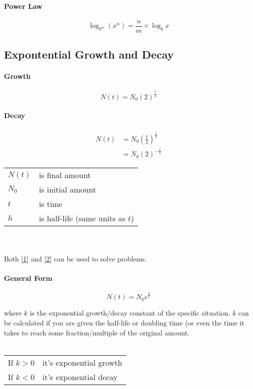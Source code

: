 \documentclass{article}
\numberwithin{equation}{section}
\begin{document}
\paragraph{Power Law}
\begin{equation}
	\log_{b^m}(x^n) = \frac{n}{m} \times \log_b x
\end{equation}

\subsection{Expontential Growth and Decay}
\paragraph{Growth}
\begin{equation}
	N(t) = N_0 (2)^{\textstyle\frac{t}{h}}
\end{equation}
\paragraph{Decay}
\begin{align}
	N(t) &= N_0 \left(\frac{1}{2}\right)^{\textstyle\frac{t}{h}} \label{1} \\
			 &= N_0 (2)^{-\textstyle\frac{t}{h}} \label{2}
\end{align}

\begin{tabular}{l l}
	$N(t)$ & is final amount \\
	$N_0$ & is initial amount \\
	$t$ & is time \\
	$h$ & is half-life (same units as $t$)
\end{tabular}
\\ \\
Both \eqref{1} and \eqref{2} can be used to solve problems.

\paragraph{General Form}
\begin{equation}
	N(t) = N_0 e^{\textstyle\frac{k}{t}}
\end{equation}

where $k$ is the exponential growth/decay constant of the specific situation. $k$ can be calculated if you are given the half-life or doubling time (or even the time it takes to reach some fraction/multiple of the original amount.
\\ \\
\begin{tabular}{l l}
	If $k > 0$ & it's exponential growth \\
	If $k < 0$ & it's exponential decay
\end{tabular}
\end{document}
